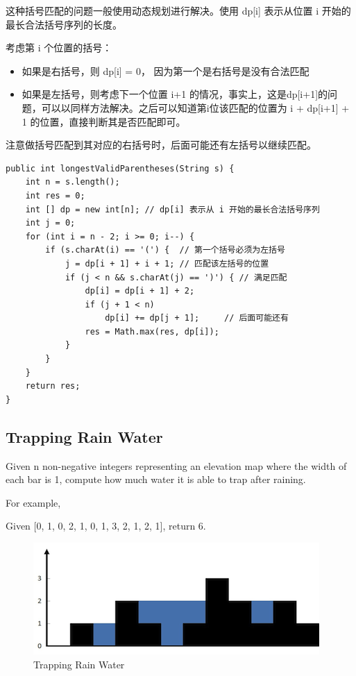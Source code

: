 \documentclass[12pt]{book}
\begin{document}
\begin{enumerate}
这种括号匹配的问题一般使用动态规划进行解决。使用 dp[i] 表示从位置 i 开始的最长合法括号序列的长度。

考虑第 i 个位置的括号：
\begin{itemize}
\item 如果是右括号，则 dp[i] = 0， 因为第一个是右括号是没有合法匹配
\item 如果是左括号，则考虑下一个位置 i+1 的情况，事实上，这是dp[i+1]的问题，可以以同样方法解决。之后可以知道第i位该匹配的位置为 i + dp[i+1] + 1 的位置，直接判断其是否匹配即可。
\end{itemize}
注意做括号匹配到其对应的右括号时，后面可能还有左括号以继续匹配。
\lstset{language=java,label= ,caption= ,numbers=none}
\begin{lstlisting}
public int longestValidParentheses(String s) {
    int n = s.length();
    int res = 0;
    int [] dp = new int[n]; // dp[i] 表示从 i 开始的最长合法括号序列
    int j = 0;
    for (int i = n - 2; i >= 0; i--) {
        if (s.charAt(i) == '(') {  // 第一个括号必须为左括号
            j = dp[i + 1] + i + 1; // 匹配该左括号的位置
            if (j < n && s.charAt(j) == ')') { // 满足匹配
                dp[i] = dp[i + 1] + 2;
                if (j + 1 < n)
                    dp[i] += dp[j + 1];     // 后面可能还有
                res = Math.max(res, dp[i]);
            }
        }
    }
    return res;
}
\end{lstlisting}
\end{enumerate}

\subsection{Trapping Rain Water}
\label{sec-5-3-2}
Given n non-negative integers representing an elevation map where the width of each bar is 1, compute how much water it is able to trap after raining.

For example, 

Given [0, 1, 0, 2, 1, 0, 1, 3, 2, 1, 2, 1], return 6.

\begin{figure}[htb]
\centering
\includegraphics[width=.9\linewidth]{./pic/rainwatertrap.png}
\caption{Trapping Rain Water}
\end{figure}
\end{document}
